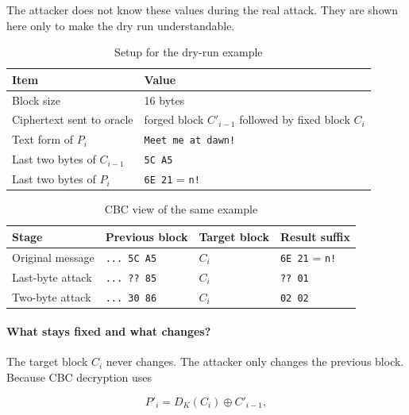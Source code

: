 The attacker does not know these values during the real attack. They are shown here only to make the dry run understandable.

\begin{table}[H]
    \centering
    \caption{Setup for the dry-run example}
    \label{tab:dry-run-setup}
    \begin{tabular}{@{}p{}p{}@{}}
        \toprule
        Item & Value \\
        \midrule
        Block size & 16 bytes \\
        Ciphertext sent to oracle & forged block $C'_{i-1}$ followed by fixed block $C_i$ \\
        Text form of $P_i$ & \texttt{Meet me at dawn!} \\
        Last two bytes of $C_{i-1}$ & \texttt{5C A5} \\
        Last two bytes of $P_i$ & \texttt{6E 21} = \texttt{n!} \\
        \bottomrule
    \end{tabular}
\end{table}

\begin{table}[H]
    \centering
    \caption{CBC view of the same example}
    \label{tab:dry-run-diagram}
    \begin{tabular}{@{}p{}p{}p{}p{}@{}}
        \toprule
        Stage & Previous block & Target block & Result suffix \\
        \midrule
        Original message & \texttt{... 5C A5} & \texttt{$C_i$} & \texttt{6E 21} = \texttt{n!} \\
        Last-byte attack & \texttt{... ?? 85} & \texttt{$C_i$} & \texttt{?? 01} \\
        Two-byte attack & \texttt{... 30 86} & \texttt{$C_i$} & \texttt{02 02} \\
        \bottomrule
    \end{tabular}
\end{table}

\paragraph{What stays fixed and what changes?}
The target block $C_i$ never changes. The attacker only changes the previous block. Because CBC decryption uses

\[
P'_i = D_K(C_i) \oplus C'_{i-1},
\]

